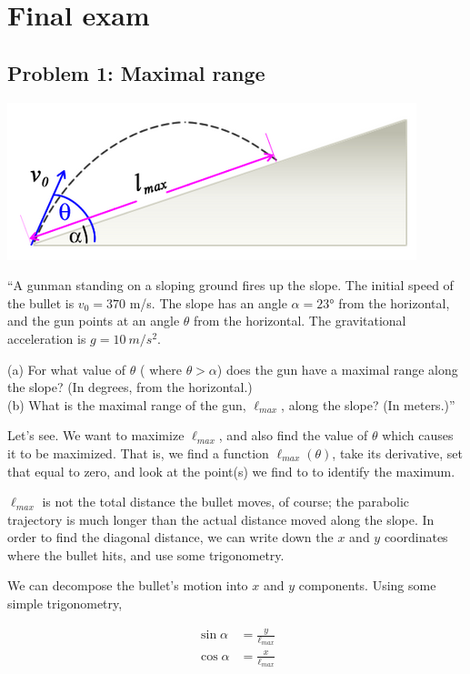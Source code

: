 \documentclass[8.01x]{subfiles}
\begin{document}
\chapter{Final exam}

\section{Problem 1: Maximal range}

\begin{center}
\includegraphics[scale=0.65]{Graphics/finalexam_p1}
\end{center}

``A gunman standing on a sloping ground fires up the slope. The initial speed of the bullet is $v_0 = 370$ m/s. The slope has an angle $\alpha = \ang{23}$ from the horizontal, and the gun points at an angle $\theta$ from the horizontal. The gravitational acceleration is $g = \SI{10}{m/s^2}$.

(a) For what value of $\theta$ ( where $\theta>\alpha$) does the gun have a maximal range along the slope? (In degrees, from the horizontal.)\\
(b) What is the maximal range of the gun, $\ell_{max}$, along the slope? (In meters.)''

Let's see. We want to maximize $\ell_{max}$, and also find the value of $\theta$ which causes it to be maximized. That is, we find a function $\ell_{max}(\theta)$, take its derivative, set that equal to zero, and look at the point(s) we find to to identify the maximum.

$\ell_{max}$ is not the total distance the bullet moves, of course; the parabolic trajectory is much longer than the actual distance moved along the slope. In order to find the diagonal distance, we can write down the $x$ and $y$ coordinates where the bullet hits, and use some trigonometry.

We can decompose the bullet's motion into $x$ and $y$ components. Using some simple trigonometry,

\begin{align}
\sin \alpha &= \frac{y}{\ell_{max}}\\
\cos \alpha &= \frac{x}{\ell_{max}}
\end{align}
\end{document}
